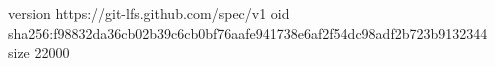 version https://git-lfs.github.com/spec/v1
oid sha256:f98832da36cb02b39c6cb0bf76aafe941738e6af2f54dc98adf2b723b9132344
size 22000
